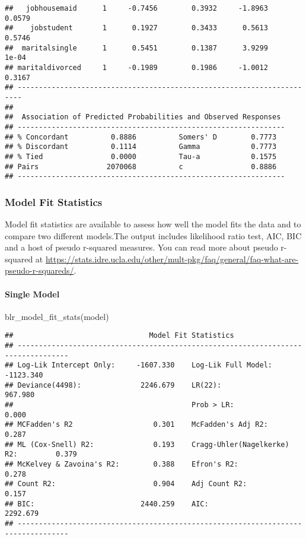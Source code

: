 \documentclass[
]{article}
\newenvironment{Shaded}{\begin{snugshade}}{\end{snugshade}}
\newcommand{\FunctionTok}[1]{\textcolor[rgb]{0.00,0.00,0.00}{#1}}
\newcommand{\NormalTok}[1]{#1}
\begin{document}
\begin{verbatim}
##   jobhousemaid      1     -0.7456        0.3932     -1.8963      0.0579 
##    jobstudent       1      0.1927        0.3433      0.5613      0.5746 
##  maritalsingle      1      0.5451        0.1387      3.9299       1e-04 
## maritaldivorced     1     -0.1989        0.1986     -1.0012      0.3167 
## -----------------------------------------------------------------------
## 
##  Association of Predicted Probabilities and Observed Responses  
## ---------------------------------------------------------------
## % Concordant          0.8886          Somers' D        0.7773   
## % Discordant          0.1114          Gamma            0.7773   
## % Tied                0.0000          Tau-a            0.1575   
## Pairs                2070068          c                0.8886   
## ---------------------------------------------------------------
\end{verbatim}

\hypertarget{model-fit-statistics}{%
\subsubsection{Model Fit Statistics}\label{model-fit-statistics}}

Model fit statistics are available to assess how well the model fits the
data and to compare two different models.The output includes likelihood
ratio test, AIC, BIC and a host of pseudo r-squared measures. You can
read more about pseudo r-squared at
\url{https://stats.idre.ucla.edu/other/mult-pkg/faq/general/faq-what-are-pseudo-r-squareds/}.

\hypertarget{single-model}{%
\paragraph{Single Model}\label{single-model}}

\begin{Shaded}
\begin{Highlighting}[]
\FunctionTok{blr\_model\_fit\_stats}\NormalTok{(model)}
\end{Highlighting}
\end{Shaded}

\begin{verbatim}
##                                Model Fit Statistics                                
## ----------------------------------------------------------------------------------
## Log-Lik Intercept Only:     -1607.330    Log-Lik Full Model:             -1123.340 
## Deviance(4498):              2246.679    LR(22):                           967.980 
##                                          Prob > LR:                          0.000 
## MCFadden's R2                   0.301    McFadden's Adj R2:                  0.287 
## ML (Cox-Snell) R2:              0.193    Cragg-Uhler(Nagelkerke) R2:         0.379 
## McKelvey & Zavoina's R2:        0.388    Efron's R2:                         0.278 
## Count R2:                       0.904    Adj Count R2:                       0.157 
## BIC:                         2440.259    AIC:                             2292.679 
## ----------------------------------------------------------------------------------
\end{verbatim}
\end{document}
